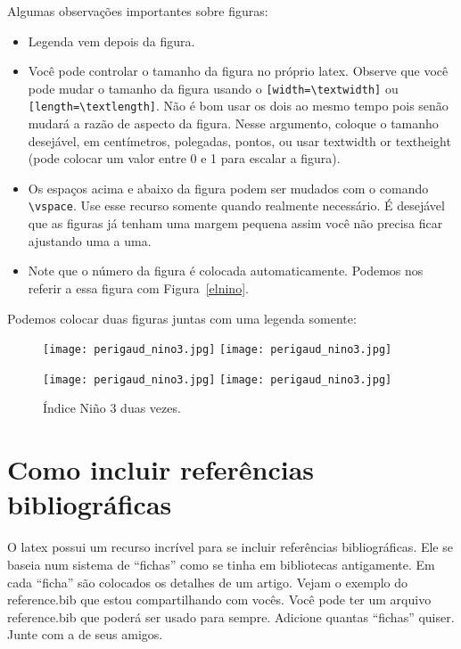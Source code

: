 \documentclass[pdftex,12pt,a4paper]{article} %
\begin{document}
Algumas observações importantes sobre figuras:
\begin{itemize}
\item Legenda vem depois da figura.
  \item Você pode controlar o tamanho da figura no próprio
    latex. Observe que você pode mudar o tamanho da figura usando o
    \verb#[width=\textwidth]# ou \verb#[length=\textlength]#. Não é
    bom usar os dois ao mesmo tempo pois senão mudará a razão de
    aspecto da figura. Nesse argumento, coloque o tamanho desejável,
    em centímetros, polegadas, pontos, ou usar textwidth or textheight
    (pode colocar um valor entre 0 e 1 para escalar a figura).
  \item Os espaços acima e abaixo da figura podem ser mudados com o
  comando \verb#\vspace#. Use esse recurso somente quando realmente
  necessário. É desejável que as figuras já tenham uma margem pequena
  assim você não precisa ficar ajustando uma a uma.
\item Note que o número da figura é colocada automaticamente. Podemos
  nos referir a essa figura com Figura~\ref{elnino}.
\end{itemize}

Podemos colocar duas figuras juntas com uma legenda somente:
\begin{figure}[ht]
\vspace{.5cm}
\centerline{\hbox{\texttt{[image: perigaud\_nino3.jpg]}}
{\texttt{[image: perigaud\_nino3.jpg]}}}
\centerline{\hbox{\texttt{[image: perigaud\_nino3.jpg]}}
{\texttt{[image: perigaud\_nino3.jpg]}}}
\vspace{-.5cm}
\caption{\small Índice Niño 3 duas vezes.}
\label{elnino2}
\end{figure}

\section{Como incluir referências bibliográficas}

O latex possui um recurso incrível para se incluir referências
bibliográficas. Ele se baseia num sistema de ``fichas'' como se tinha
em bibliotecas antigamente.  Em cada ``ficha'' são colocados os
detalhes de um artigo. Vejam o exemplo do reference.bib que estou
compartilhando com vocês. Você pode ter um arquivo reference.bib que
poderá ser usado para sempre. Adicione quantas ``fichas''
quiser. Junte com a de seus amigos.
\end{document}
